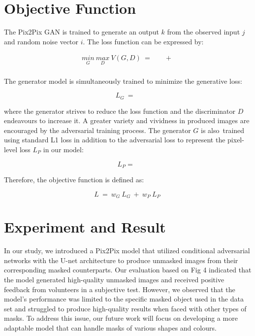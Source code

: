 \documentclass{./styles/svproc}
\begin{document}
\section{Objective Function}

The Pix2Pix GAN is trained to generate an output $k$ from the observed input $j$ and random noise vector $i$. The loss function can be expressed by:

\begin{equation}
\begin{aligned}
\underset{G}{min}\ \underset{D}{max}\ V(G, D)\ =\ {} & \mathop{\mathbb{E}_{j,k\ \sim\ p_{data}(j, k)} [\log\ D(j, k)]}\ +\ \\
& \mathop{\mathbb{E}_{j\ \sim\ p_{data}(j) , k\ \sim\ p_{data}(k)} [\log\ (1 - D(j, G(j, k)))]}
\label{eq1}
\end{aligned}
\end{equation}

The generator model is simultaneously trained to minimize the generative loss:	

\begin{equation}
L_G\ =\ \mathop{\mathbb{E}_{j\ \sim\ p_{data}(j) , k\ \sim\ p_{data}(k)} [\log\ (1 - D(j, G(j, k)))]}
\label{eq2}
\end{equation}

where the generator strives to reduce the loss function and the discriminator $D$ endeavours to increase it. A greater variety and vividness in produced images are encouraged by the adversarial training process. The generator $G$ is also trained using standard L1 loss in addition to the adversarial loss to represent the pixel-level loss $L_P$ in our model: 

\begin{equation}
L_P = \mathop{\mathbb{E}_{j,k\ \sim\ p_{data}(j,k) , i\ \sim\ p_{data}(i)} [\left\| k - G(j, i) \right\|]}
\label{eq3}
\end{equation}

Therefore, the objective function is defined as:

\begin{equation}
\label{eq4}
L\ =\ w_G\ L_G\ +\ w_P\ L_P\ 
\end{equation}

\section{Experiment and Result}

In our study, we introduced a Pix2Pix model that utilized conditional adversarial networks with the U-net architecture to produce unmasked images from their corresponding masked counterparts. Our evaluation based on Fig 4 indicated that the model generated high-quality unmasked images and received positive feedback from volunteers in a subjective test. However, we observed that the model's performance was limited to the specific masked object used in the data set and struggled to produce high-quality results when faced with other types of masks. To address this issue, our future work will focus on developing a more adaptable model that can handle masks of various shapes and colours.
\end{document}
